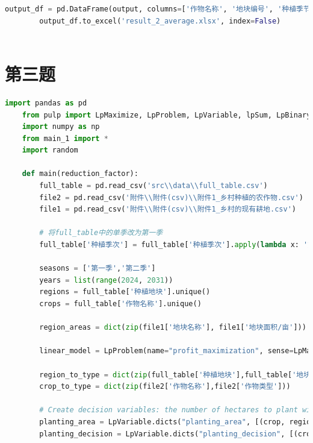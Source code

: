 \documentclass{cumcmthesis}
\begin{document}
\begin{appendices}
\begin{lstlisting}[language=python]
        output_df = pd.DataFrame(output, columns=['作物名称', '地块编号', '种植季节','年份', '种植数量'])
        output_df.to_excel('result_2_average.xlsx', index=False)
    
\end{lstlisting}

\section{第三题}
\begin{lstlisting}[language=python]
    import pandas as pd
    from pulp import LpMaximize, LpProblem, LpVariable, lpSum, LpBinary
    import numpy as np
    from main_1 import *
    import random
    
    def main(reduction_factor):
        full_table = pd.read_csv('src\\data\\full_table.csv')
        file2 = pd.read_csv('附件\\附件(csv)\\附件1_乡村种植的农作物.csv')
        file1 = pd.read_csv('附件\\附件(csv)\\附件1_乡村的现有耕地.csv')
        
        # 将full_table中的单季改为第一季
        full_table['种植季次'] = full_table['种植季次'].apply(lambda x: '第一季' if x == '单季' else x)
    
        seasons = ['第一季','第二季']
        years = list(range(2024, 2031))
        regions = full_table['种植地块'].unique()
        crops = full_table['作物名称'].unique()
    
        region_areas = dict(zip(file1['地块名称'], file1['地块面积/亩']))
        
        linear_model = LpProblem(name="profit_maximization", sense=LpMaximize)
        
        region_to_type = dict(zip(full_table['种植地块'],full_table['地块类型']))
        crop_to_type = dict(zip(file2['作物名称'],file2['作物类型']))
    
        # Create decision variables: the number of hectares to plant with [each crop] in [each region] at [each year] at [each season] and the decision to plant or not
        planting_area = LpVariable.dicts("planting_area", [(crop, region, year, season) for crop in crops for region in regions for year in years for season in seasons], lowBound=0, cat='Continuous')
        planting_decision = LpVariable.dicts("planting_decision", [(crop, region, year, season) for crop in crops for region in regions for year in years for season in seasons], cat='Binary')
    

\end{lstlisting}
\end{appendices}
\end{document}
